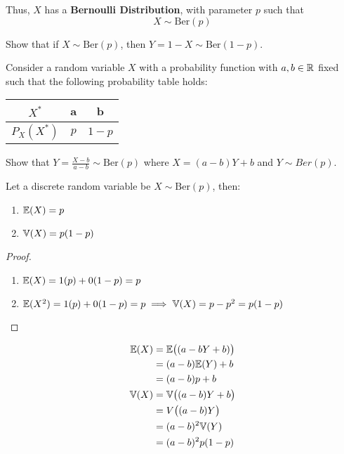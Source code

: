 \documentclass{article}
\begin{document}
	Thus, $X$ has a \textbf{Bernoulli Distribution}, with parameter $p$ such that
	$$ X \sim \text{Ber}(p)$$ 
	\begin{exe}
		Show that if $X \sim \text{Ber}(p)$, then $Y = 1- X \sim \text{Ber}(1-p)$.
	\end{exe}
	\begin{exe}
		Consider a random variable $X$ with a probability function with $a,b \in \mathbb{R}$ fixed such that the following probability table holds:
		\begin{table}[h]
			\begin{tabular}{c|c|c}
				$X^*$ & a     & b     \\ \hline
				$P_X(X^*)$ & $p$ & $1-p$
			\end{tabular}
		\end{table}
	
		Show that $Y = \frac{X-b}{a-b} \sim \text{Ber}(p)$ where $X = (a-b) Y + b$ and $Y \sim Ber(p)$.
	\end{exe}
\pagebreak
	\begin{prop}
		Let a discrete random variable be $X \sim \text{Ber}(p)$, then:
		\begin{enumerate}
			\item $\mathbb{E}(X) = p$ 
			\item $\mathbb{V}(X) = p(1-p)$
		\end{enumerate}
	\end{prop}
	\begin{proof}
		\begin{enumerate}
			\item $\mathbb{E}(X) = 1(p) + 0 (1-p) = p$ 
			\item $\mathbb{E}(X^2) = 1(p)+0(1-p) = p  \implies \mathbb{V} (X) = p - p^2 = p(1-p)$
		\end{enumerate}
	\end{proof}
	\begin{rem}
		\begin{align*}
			\mathbb{E}(X) &= \mathbb{E} \big( (a-b Y + b) \big) \\
			&= (a-b) \mathbb{E}(Y) +b \\
			&= (a-b) p +b \\
			\mathbb{V}(X) &= \mathbb{V}\big( (a-b) Y +b \big) \\
			&= V \big( (a-b) Y \big) \\
			&= (a-b)^2 \mathbb{V}(Y) \\
			&= (a-b)^2 p (1-p)
 		\end{align*}
	\end{rem}
\end{document}
